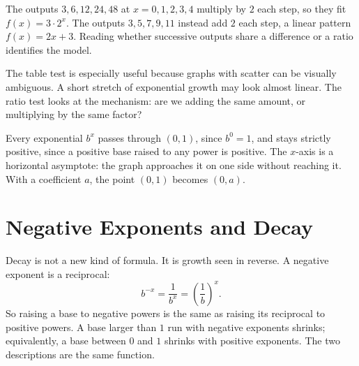 \documentclass[12pt]{book}
\begin{document}
\begin{example}
The outputs $3, 6, 12, 24, 48$ at $x=0,1,2,3,4$ multiply by $2$ each step, so they
fit $f(x)=3\cdot2^{x}$. The outputs $3,5,7,9,11$ instead add $2$ each step, a linear
pattern $f(x)=2x+3$. Reading whether successive outputs share a difference or a ratio
identifies the model.
\end{example}

The table test is especially useful because graphs with scatter can be visually
ambiguous. A short stretch of exponential growth may look almost linear. The ratio test
looks at the mechanism: are we adding the same amount, or multiplying by the same
factor?

\begin{center}
\end{center}

Every exponential $b^{x}$ passes through $(0,1)$, since $b^{0}=1$, and stays strictly
positive, since a positive base raised to any power is positive. The $x$-axis is a
horizontal asymptote: the graph approaches it on one side without reaching it. With a
coefficient $a$, the point $(0,1)$ becomes $(0,a)$.

\newpage
\section{Negative Exponents and Decay}

Decay is not a new kind of formula. It is growth seen in reverse. A negative exponent is
a reciprocal:
\[
b^{-x}=\frac{1}{b^{x}}=\left(\frac1b\right)^{x}.
\]
So raising a base to negative powers is the same as raising its reciprocal to positive
powers. A base larger than $1$ run with negative exponents shrinks; equivalently, a base
between $0$ and $1$ shrinks with positive exponents. The two descriptions are the same
function.
\end{document}
